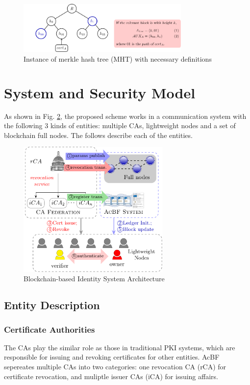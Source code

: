 \documentclass[conference]{IEEEtran}
\begin{document}
\begin{figure}[t]
	\centering
	\includegraphics[width=8.5cm]{mht}
	\caption{Instance of merkle hash tree (MHT) with necessary definitions}\label{fig:mht}
\end{figure}

\section{System and Security Model} \label{sec:model}
As shown in Fig. \ref{fig:model}, the proposed scheme works in a communication system with the following 3 kinds of entities: multiple CAs, lightweight nodes and a set of blockchain full nodes. The follows describe each of the entities. 


\begin{figure}[t]
	\centering
	\includegraphics[width=7.5cm]{model}
	\caption{Blockchain-based Identity System Architecture}\label{fig:model}
\end{figure}
\subsection{Entity Description}
\subsubsection{Certificate Authorities}
 The CAs play the similar role as those in traditional PKI systems, which are responsible for issuing and revoking certificates for other entities. AcBF sepereates multiple CAs into two categories: one revocation CA (rCA) for certificate revocation, and muliptle issuer CAs (iCA) for issuing affairs. 
 
\end{document}
